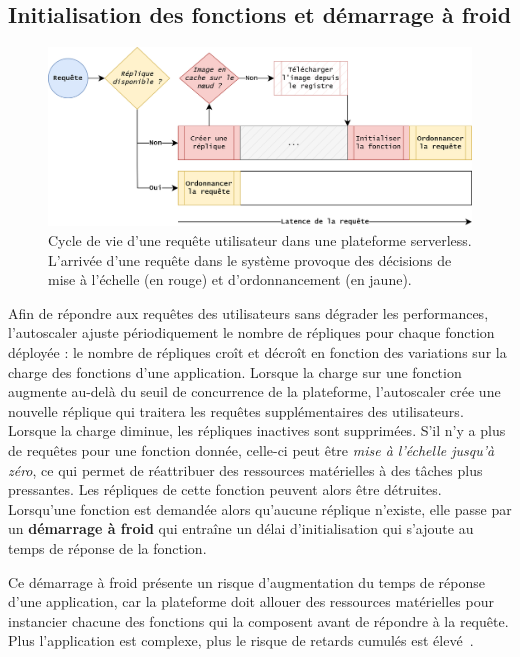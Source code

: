 \subsection{Initialisation des fonctions et démarrage à froid}
\label{section:herocache-background-cache}

\begin{figure}[!ht]
    \centering
    \includegraphics[width=0.8\columnwidth]{5_Chapitre5/figures/function-cache.png}
    \caption{Cycle de vie d'une requête utilisateur dans une plateforme serverless. L'arrivée d'une requête dans le système provoque des décisions de mise à l'échelle (en rouge) et d'ordonnancement (en jaune).}
    \label{figure:herocache-function-cache}
\end{figure}

Afin de répondre aux requêtes des utilisateurs sans dégrader les performances, l'autoscaler ajuste périodiquement le nombre de répliques pour chaque fonction déployée : le nombre de répliques croît et décroît en fonction des variations sur la charge des fonctions d'une application. Lorsque la charge sur une fonction augmente au-delà du seuil de concurrence de la plateforme, l'autoscaler crée une nouvelle réplique qui traitera les requêtes supplémentaires des utilisateurs. Lorsque la charge diminue, les répliques inactives sont supprimées. S'il n'y a plus de requêtes pour une fonction donnée, celle-ci peut être \textit{mise à l'échelle jusqu'à zéro}, ce qui permet de réattribuer des ressources matérielles à des tâches plus pressantes. Les répliques de cette fonction peuvent alors être détruites. Lorsqu'une fonction est demandée alors qu'aucune réplique n'existe, elle passe par un \textbf{démarrage à froid} qui entraîne un délai d'initialisation qui s'ajoute au temps de réponse de la fonction.

Ce démarrage à froid présente un risque d'augmentation du temps de réponse d'une application, car la plateforme doit allouer des ressources matérielles pour instancier chacune des fonctions qui la composent avant de répondre à la requête. Plus l'application est complexe, plus le risque de retards cumulés est élevé~\cite{mohanAgileColdStartsa}.

